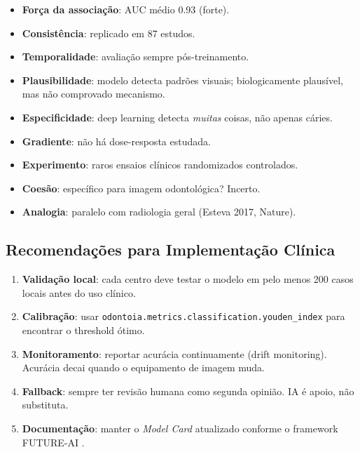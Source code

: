 \begin{itemize}
    \item[$\checkmark$] \textbf{Força da associação}: AUC médio 0.93 (forte).
    \item[$\checkmark$] \textbf{Consistência}: replicado em 87 estudos.
    \item[$\checkmark$] \textbf{Temporalidade}: avaliação sempre pós-treinamento.
    \item[$\sim$] \textbf{Plausibilidade}: modelo detecta padrões
    visuais; biologicamente plausível, mas não comprovado mecanismo.
    \item[$\times$] \textbf{Especificidade}: deep learning detecta
    \emph{muitas} coisas, não apenas cáries.
    \item[$\times$] \textbf{Gradiente}: não há dose-resposta estudada.
    \item[$\times$] \textbf{Experimento}: raros ensaios clínicos
    randomizados controlados.
    \item[$\times$] \textbf{Coesão}: específico para imagem odontológica?
    Incerto.
    \item[$\sim$] \textbf{Analogia}: paralelo com radiologia geral
    (Esteva 2017, Nature).
\end{itemize}


\subsection*{Recomendações para Implementação Clínica}

\begin{enumerate}
    \item \textbf{Validação local}: cada centro deve testar o modelo
    em pelo menos 200 casos locais antes do uso clínico.
    \item \textbf{Calibração}: usar \texttt{odontoia.metrics.classification.youden\_index}
    para encontrar o threshold ótimo.
    \item \textbf{Monitoramento}: reportar acurácia continuamente
    (drift monitoring). Acurácia decai quando o equipamento de
    imagem muda.
    \item \textbf{Fallback}: sempre ter revisão humana como
    segunda opinião. IA é apoio, não substituta.
    \item \textbf{Documentação}: manter o \emph{Model Card} atualizado
    conforme o framework FUTURE-AI \cite{futureai2025}.
\end{enumerate}

